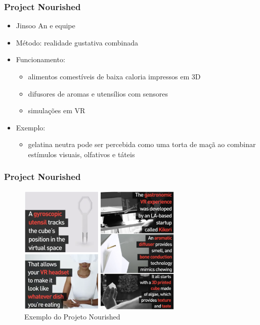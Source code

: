\documentclass{beamer}
\begin{document}
\begin{frame}
  \frametitle{Project Nourished}
  \begin{itemize}
    \item Jinsoo An e equipe
    \item Método: realidade gustativa combinada
    \item Funcionamento:
    \begin{itemize}
      \item  alimentos comestíveis de baixa caloria impressos em 3D
      \item difusores de aromas e utensílios com sensores
      \item simulações em VR
    \end{itemize}
    \item Exemplo:
    \begin{itemize}
      \item gelatina neutra pode ser percebida como uma torta de maçã ao combinar estímulos visuais, olfativos e táteis
    \end{itemize}
  \end{itemize}
\end{frame}

\begin{frame}
  \frametitle{Project Nourished}
  \begin{figure}[h]
    \centering
    \caption{Exemplo do Projeto Nourished}
    \vspace{-8pt}
    \includegraphics[width=0.7\textwidth]{img_ProjectNourished.png}
  \end{figure}
\end{frame}
\end{document}
